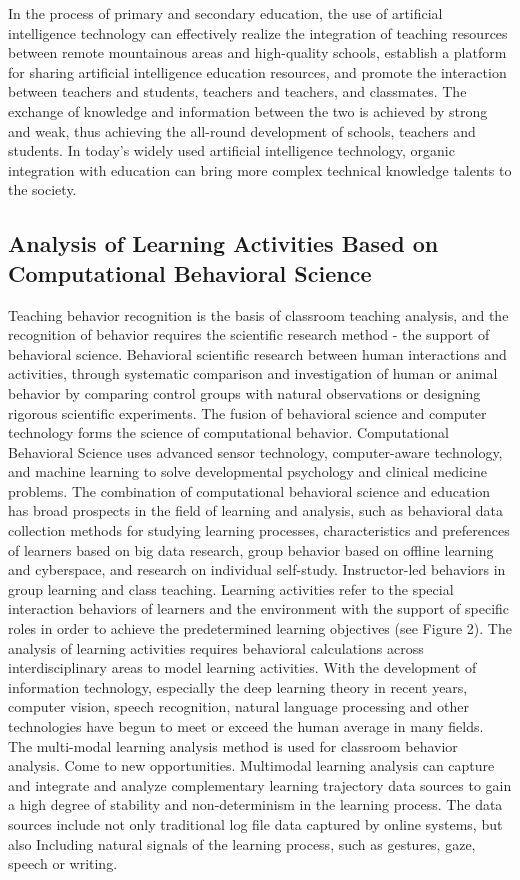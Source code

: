\documentclass[lang=en,11pt,a4paper,towcolumn]{elegantpaper}
\begin{document}
{In the process of primary and secondary education, the use of artificial intelligence technology can effectively realize the integration of teaching resources between remote mountainous areas and high-quality schools, establish a platform for sharing artificial intelligence education resources, and promote the interaction between teachers and students, teachers and teachers, and classmates. The exchange of knowledge and information between the two is achieved by strong and weak, thus achieving the all-round development of schools, teachers and students. In today's widely used artificial intelligence technology, organic integration with education can bring more complex technical knowledge talents to the society.
\subsection{Analysis of Learning Activities Based on Computational Behavioral Science}
Teaching behavior recognition is the basis of classroom teaching analysis, and the recognition of behavior requires the scientific research method - the support of behavioral science. Behavioral scientific research between human interactions and activities, through systematic comparison and investigation of human or animal behavior by comparing control groups with natural observations or designing rigorous scientific experiments. The fusion of behavioral science and computer technology forms the science of computational behavior. Computational Behavioral Science uses advanced sensor technology, computer-aware technology, and machine learning to solve developmental psychology and clinical medicine problems.
The combination of computational behavioral science and education has broad prospects in the field of learning and analysis, such as behavioral data collection methods for studying learning processes, characteristics and preferences of learners based on big data research, group behavior based on offline learning and cyberspace, and research on individual self-study. Instructor-led behaviors in group learning and class teaching. Learning activities refer to the special interaction behaviors of learners and the environment with the support of specific roles in order to achieve the predetermined learning objectives (see Figure 2). The analysis of learning activities requires behavioral calculations across interdisciplinary areas to model learning activities.
With the development of information technology, especially the deep learning theory in recent years, computer vision, speech recognition, natural language processing and other technologies have begun to meet or exceed the human average in many fields. The multi-modal learning analysis method is used for classroom behavior analysis. Come to new opportunities. Multimodal learning analysis can capture and integrate and analyze complementary learning trajectory data sources to gain a high degree of stability and non-determinism in the learning process. The data sources include not only traditional log file data captured by online systems, but also Including natural signals of the learning process, such as gestures, gaze, speech or writing.

}
\end{document}
